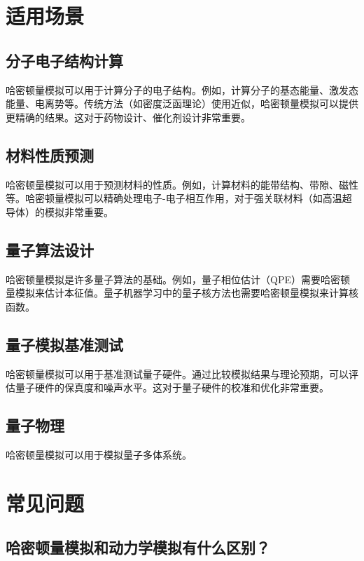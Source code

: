 \documentclass[12pt,a4paper]{article}
\begin{document}
\section{适用场景}

\subsection{分子电子结构计算}

哈密顿量模拟可以用于计算分子的电子结构。例如，计算分子的基态能量、激发态能量、电离势等。传统方法（如密度泛函理论）使用近似，哈密顿量模拟可以提供更精确的结果。这对于药物设计、催化剂设计非常重要。

\subsection{材料性质预测}

哈密顿量模拟可以用于预测材料的性质。例如，计算材料的能带结构、带隙、磁性等。哈密顿量模拟可以精确处理电子-电子相互作用，对于强关联材料（如高温超导体）的模拟非常重要。

\subsection{量子算法设计}

哈密顿量模拟是许多量子算法的基础。例如，量子相位估计（QPE）需要哈密顿量模拟来估计本征值。量子机器学习中的量子核方法也需要哈密顿量模拟来计算核函数。

\subsection{量子模拟基准测试}

哈密顿量模拟可以用于基准测试量子硬件。通过比较模拟结果与理论预期，可以评估量子硬件的保真度和噪声水平。这对于量子硬件的校准和优化非常重要。

\subsection{量子物理}

哈密顿量模拟可以用于模拟量子多体系统。

\section{常见问题}

\subsection{哈密顿量模拟和动力学模拟有什么区别？}
\end{document}
